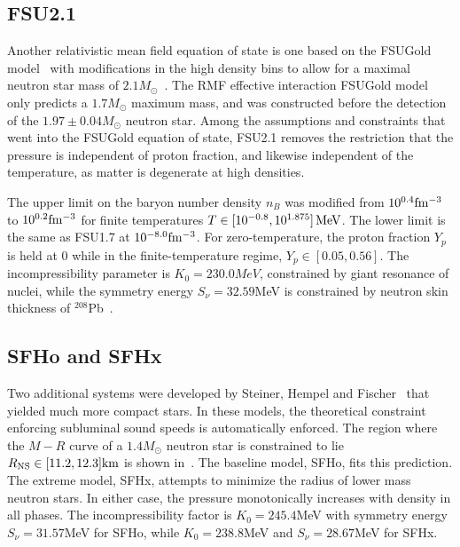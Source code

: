 \subsection{FSU2.1}
\label{sec:fsu21}

Another relativistic mean field equation of state is one based on the FSUGold model~\cite{todd2005neutron} with modifications in the high density bins to allow for a maximal neutron star mass of $2.1 M_\odot$~\cite{shen2011second}.  The RMF effective interaction FSUGold model only predicts a $1.7 M_\odot$ maximum mass, and was constructed before the detection of the $1.97 \pm 0.04 M_\odot$ neutron star.
Among the assumptions and constraints that went into the FSUGold equation of state, FSU2.1 removes the restriction that the pressure is independent of proton fraction, and likewise independent of the temperature, as matter is degenerate at high densities.

The upper limit on the baryon number density $n_B$ was modified from $10^{0.4} {\rm fm^{-3}}$ to $10^{0.2} {\rm fm^{-3}}$ for finite temperatures $T \in [10^{-0.8} , 10^{1.875}]\, {\rm MeV}$.  The lower limit is the same as FSU1.7 at $10^{-8.0} {\rm fm^{-3}}$.  For zero-temperature, the proton fraction $Y_p$ is held at $0$ while in the finite-temperature regime, $Y_p \in [0.05 , 0.56]$.  The incompressibility parameter is $K_0 = 230.0 MeV$, constrained by giant resonance of nuclei, while the symmetry energy $S_\nu = 32.59$MeV is constrained by neutron skin thickness of $^208$Pb~\cite{fattoyev2010relativistic}.

\subsection{SFHo and SFHx}
\label{sec:sfh}

Two additional systems were developed by Steiner, Hempel and Fischer~\cite{steiner2013core} that yielded much more compact stars.
In these models, the theoretical constraint enforcing subluminal sound speeds is automatically enforced.  The region where the $M-R$ curve of a $1.4 M_\odot$ neutron star is constrained to lie $R_{\rm NS} \in [11.2,12.3] {\rm km}$ is shown in~\cite{steiner6871apjl}.
The baseline model, SFHo, fits this prediction.  The extreme model, SFHx, attempts to minimize the radius of lower mass neutron stars.  In either case, the pressure monotonically increases with density in all phases.
The incompressibility factor is $K_0 = 245.4$MeV with symmetry energy $S_\nu = 31.57$MeV for SFHo, while $K_0 = 238.8$MeV and $S_\nu = 28.67$MeV for SFHx.

